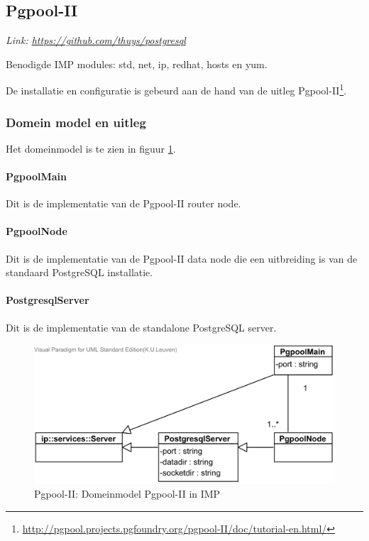


\subsection{Pgpool-II}
\textit{Link: \url{https://github.com/thuys/postgresql}}

Benodigde IMP modules: std, net, ip, redhat, hosts en yum. 

De installatie en configuratie is gebeurd aan de hand van de uitleg Pgpool-II\footnote{\url {http://pgpool.projects.pgfoundry.org/pgpool-II/doc/tutorial-en.html/}}. 

\subsubsection{Domein model en uitleg}
Het domeinmodel is te zien in figuur \ref{fig:imp-pgpool-domeinmodel}.

	\paragraph{PgpoolMain} Dit is de implementatie van de Pgpool-II router node. 
	
	\paragraph{PgpoolNode} Dit is de implementatie van de Pgpool-II data node die een uitbreiding is van de standaard PostgreSQL installatie. 
		
	\paragraph{PostgresqlServer} Dit is de implementatie van de standalone PostgreSQL server. 

\begin{figure}[ht!]
\centering
\includegraphics[width=\linewidth]{img/Postgres-Domeinmodel.png}
\caption{Pgpool-II: Domeinmodel Pgpool-II in IMP}
\label{fig:imp-pgpool-domeinmodel}
\end{figure}


